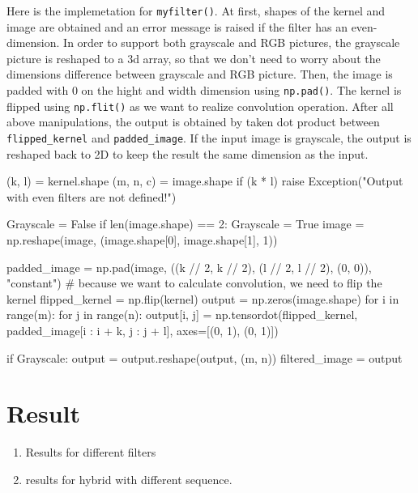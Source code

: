 Here is the implemetation for \verb|myfilter()|. At first, shapes of the kernel and image are obtained and an error message is raised if the filter has an even-dimension. In order to support both grayscale and RGB pictures, the grayscale picture is reshaped to a 3d array, so that we don't need to worry about the dimensions difference between grayscale and RGB picture. Then, the image is padded with 0 on the hight and width dimension using \verb|np.pad()|. The kernel is flipped using \verb|np.flit()| as we want to realize convolution operation. After all above manipulations, the output is obtained by taken dot product between \verb|flipped_kernel| and \verb|padded_image|. If the input image is grayscale, the output is reshaped back to 2D to keep the result the same dimension as the input.
\begin{python}
(k, l) = kernel.shape
(m, n, c) = image.shape
if (k * l) %
    raise Exception("Output with even filters are not defined!")

Grayscale = False
if len(image.shape) == 2:
    Grayscale = True
    image = np.reshape(image, (image.shape[0], image.shape[1], 1))

padded_image = np.pad(image, ((k // 2, k // 2), (l // 2, l // 2), (0, 0)), "constant")
# because we want to calculate convolution, we need to flip the kernel
flipped_kernel = np.flip(kernel)
output = np.zeros(image.shape)
for i in range(m):
    for j in range(n):
        output[i, j] = np.tensordot(flipped_kernel, padded_image[i : i + k, j : j + l], axes=[(0, 1), (0, 1)])

if Grayscale:
    output = output.reshape(output, (m, n))
filtered_image = output
\end{python}
\section*{Result}

\begin{enumerate}
    \item Results for different filters

    \item results for hybrid with different sequence.
\end{enumerate}

